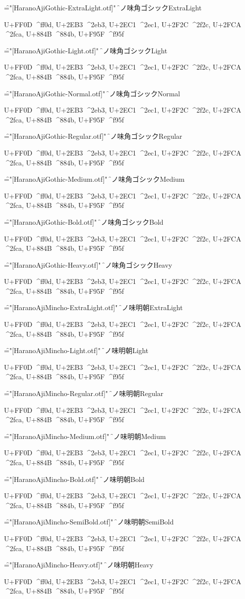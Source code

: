 
\nopagenumbers

\def\test{%
U+FF0D ^^^^ff0d,
U+2EB3 ^^^^2eb3,
U+2EC1 ^^^^2ec1,
U+2F2C ^^^^2f2c,
U+2FCA ^^^^2fca,
U+884B ^^^^884b,
U+F95F ^^^^f95f
}

\font\f="[HaranoAjiGothic-ExtraLight.otf]" \f
原ノ味角ゴシックExtraLight\par
\test

\font\f="[HaranoAjiGothic-Light.otf]" \f
原ノ味角ゴシックLight\par
\test

\font\f="[HaranoAjiGothic-Normal.otf]" \f
原ノ味角ゴシックNormal\par
\test

\font\f="[HaranoAjiGothic-Regular.otf]" \f
原ノ味角ゴシックRegular\par
\test

\font\f="[HaranoAjiGothic-Medium.otf]" \f
原ノ味角ゴシックMedium\par
\test

\font\f="[HaranoAjiGothic-Bold.otf]" \f
原ノ味角ゴシックBold\par
\test

\font\f="[HaranoAjiGothic-Heavy.otf]" \f
原ノ味角ゴシックHeavy\par
\test

\font\f="[HaranoAjiMincho-ExtraLight.otf]" \f
原ノ味明朝ExtraLight\par
\test

\font\f="[HaranoAjiMincho-Light.otf]" \f
原ノ味明朝Light\par
\test

\font\f="[HaranoAjiMincho-Regular.otf]" \f
原ノ味明朝Regular\par
\test

\font\f="[HaranoAjiMincho-Medium.otf]" \f
原ノ味明朝Medium\par
\test

\font\f="[HaranoAjiMincho-Bold.otf]" \f
原ノ味明朝Bold\par
\test

\font\f="[HaranoAjiMincho-SemiBold.otf]" \f
原ノ味明朝SemiBold\par
\test

\font\f="[HaranoAjiMincho-Heavy.otf]" \f
原ノ味明朝Heavy\par
\test

\bye
